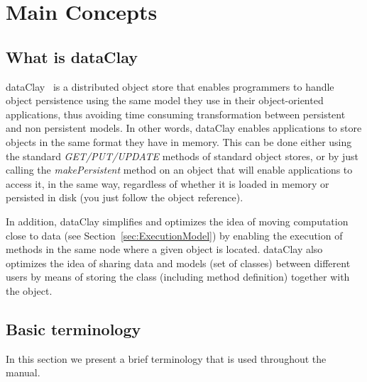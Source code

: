 
\chapter{Main Concepts}

\section{What is dataClay}

dataClay~\cite{MARTI2017129,MartiFraiz2017} is a distributed object store that enables programmers to handle object persistence using the same model they use in their object-oriented applications, thus avoiding time consuming transformation between persistent and non persistent models. In other words, dataClay enables applications to store objects in the same format they have in memory. This can be done either using the standard \textit{GET/PUT/UPDATE} methods of standard object stores, or by just calling the \textit{makePersistent} method on an object that will enable applications to access it, in the same way, regardless of whether it is loaded in memory or persisted in disk (you just follow the object reference).

In addition, dataClay simplifies and optimizes the idea of moving computation close to data (see Section~\ref{sec:ExecutionModel}) by enabling the execution of methods in the same node where a given object is located. dataClay also optimizes the idea of sharing data and models (set of classes) between different users by means of storing the class (including method definition) together with the object.

\section{Basic terminology}

In this section we present a brief terminology that is used throughout the manual. 

